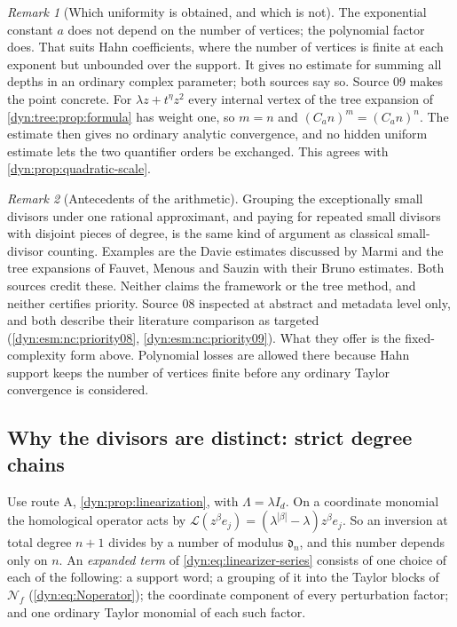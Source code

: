 \documentclass[11pt,letterpaper]{article}
\theoremstyle{definition}
\theoremstyle{remark}
\newtheorem{remark}[remark]{Remark}
\newcommand{\Li}{\mathcal L}
\newcommand{\NN}{\mathcal N}
\numberwithin{equation}{section}
\begin{document}
\begin{remark}[Which uniformity is obtained, and which is not]
\label{dyn:esm:rem:uniformity}
The exponential constant $a$ does not depend on the number of vertices; the
polynomial factor does. That suits Hahn coefficients, where the number of
vertices is finite at each exponent but unbounded over the support. It gives
no estimate for summing all depths in an ordinary complex parameter; both
sources say so. Source 09 makes the point concrete. For $\lambda z+t^{\eta}z^{2}$
every internal vertex of the tree expansion of
\cref{dyn:tree:prop:formula} has weight one, so $m=n$ and
$(C_an)^{m}=(C_an)^{n}$. The estimate then gives no ordinary analytic
convergence, and no hidden uniform estimate lets the two quantifier orders
be exchanged. This agrees with \cref{dyn:prop:quadratic-scale}.
\end{remark}

\begin{remark}[Antecedents of the arithmetic]\label{dyn:esm:rem:antecedents}
Grouping the exceptionally small divisors under one rational approximant,
and paying for repeated small divisors with disjoint pieces of degree, is
the same kind of argument as classical small-divisor counting. Examples are
the Davie estimates discussed by Marmi \cite{Marmi} and the tree expansions
of Fauvet, Menous and Sauzin \cite{FauvetMenousSauzin,FMS26} with their
Bruno estimates. Both sources credit these. Neither claims the framework or
the tree method, and neither certifies priority. Source 08 inspected
\cite{FauvetMenousSauzin} at abstract and metadata level only, and both
describe their literature comparison as targeted (\ref{dyn:esm:nc:priority08},
\ref{dyn:esm:nc:priority09}). What they offer is the fixed-complexity form above.
Polynomial losses are allowed there because Hahn support keeps the number of
vertices finite before any ordinary Taylor convergence is considered.
\end{remark}

\subsection{Why the divisors are distinct: strict degree chains}
\label{dyn:esm:subsec:chains}

Use route A, \cref{dyn:prop:linearization}, with $\Lambda=\lambda I_d$. On
a coordinate monomial the homological operator acts by
$\Li(z^{\beta}e_j)=(\lambda^{|\beta|}-\lambda)z^{\beta}e_j$. So an inversion
at total degree $n+1$ divides by a number of modulus $\mathfrak d_n$, and
this number depends only on $n$. An \emph{expanded term} of
\eqref{dyn:eq:linearizer-series} consists of one choice of each of the
following: a support word; a grouping of it into the Taylor blocks of
$\NN_f$ (\eqref{dyn:eq:Noperator}); the coordinate component of every
perturbation factor; and one ordinary Taylor monomial of each such factor.
\end{document}
